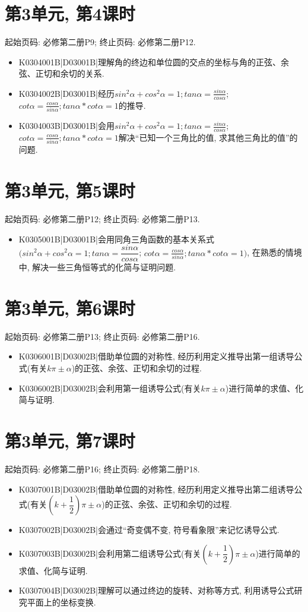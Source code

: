 \section*{第3单元, 第4课时}
起始页码: 必修第二册P9; 终止页码: 必修第二册P12.
\begin{itemize}
\item K0304001B|D03001B|理解角的终边和单位圆的交点的坐标与角的正弦、余弦、正切和余切的关系.
\item K0304002B|D03001B|经历$sin^2\alpha+cos^2\alpha=1;tan\alpha=\frac{sin\alpha}{cos\alpha}$; $cot\alpha=\frac{cos\alpha}{sin\alpha};tan\alpha*cot\alpha=1$的推导.
\item K0304003B|D03001B|会用$sin^2\alpha+cos^2\alpha=1;tan\alpha=\frac{sin\alpha}{cos\alpha}$; $cot\alpha=\frac{cos\alpha}{sin\alpha};tan\alpha*cot\alpha=1$解决``已知一个三角比的值, 求其他三角比的值''的问题.
\end{itemize}

\section*{第3单元, 第5课时}
起始页码: 必修第二册P12; 终止页码: 必修第二册P13.
\begin{itemize}
\item K0305001B|D03001B|会用同角三角函数的基本关系式$(sin^2\alpha+cos^2\alpha=1;tan\alpha=\dfrac{sin\alpha}{cos\alpha}$; $cot\alpha=\frac{cos\alpha}{sin\alpha};tan\alpha*cot\alpha=1)$, 在熟悉的情境中, 解决一些三角恒等式的化简与证明问题.
\end{itemize}

\section*{第3单元, 第6课时}
起始页码: 必修第二册P13; 终止页码: 必修第二册P16.
\begin{itemize}
\item K0306001B|D03002B|借助单位圆的对称性, 经历利用定义推导出第一组诱导公式(有关$k\pi\pm \alpha$)的正弦、余弦、正切和余切的过程.
\item K0306002B|D03002B|会利用第一组诱导公式(有关$k\pi\pm \alpha$)进行简单的求值、化简与证明.
\end{itemize}

\section*{第3单元, 第7课时}
起始页码: 必修第二册P16; 终止页码: 必修第二册P18.
\begin{itemize}
\item K0307001B|D03002B|借助单位圆的对称性, 经历利用定义推导出第二组诱导公式(有关$(k+\dfrac 12)\pi\pm \alpha$)的正弦、余弦、正切和余切的过程.
\item K0307002B|D03002B|会通过``奇变偶不变, 符号看象限''来记忆诱导公式.
\item K0307003B|D03002B|会利用第二组诱导公式(有关$(k+\dfrac 12)\pi\pm \alpha$)进行简单的求值、化简与证明.
\item K0307004B|D03002B|理解可以通过终边的旋转、对称等方式, 利用诱导公式研究平面上的坐标变换.
\end{itemize}

